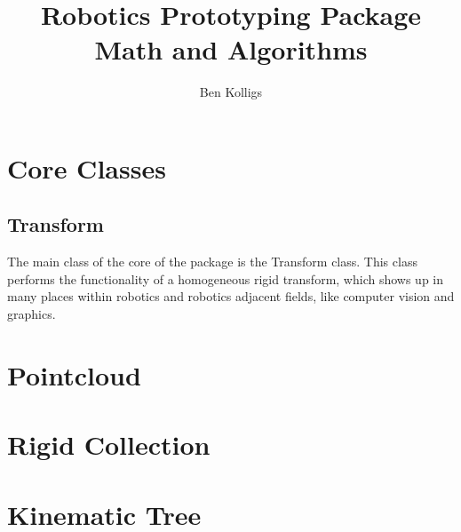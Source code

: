 \documentclass[12pt]{article}
\title{Robotics Prototyping Package Math and Algorithms}
\author{Ben Kolligs}
\date{}
\begin{document}
	\maketitle
	\tableofcontents
	\break
	\section{Core Classes}
	\subsection{Transform}
	The main class of the core of the package is the Transform class. 
	This class performs the functionality of a homogeneous rigid transform, which shows up in many places within robotics and robotics adjacent fields, like computer vision and graphics. 

	
	\section{Pointcloud}
	

	\section{Rigid Collection}
	\label{sec: rigid}
	

	\section{Kinematic Tree}
	\label{sec: kin tree}
	
\end{document}
